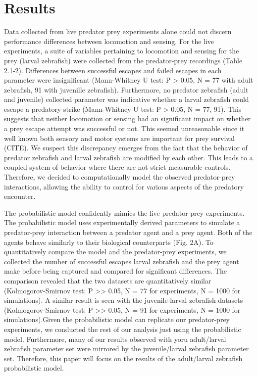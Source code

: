 \documentclass[]{rsos}%
\begin{document}
\section{Results}
Data collected from live predator prey experiments alone could not discern performance differences between locomotion and sensing. For the live experiments, a suite of variables pertaining to locomotion and sensing for the prey (larval zebrafish) were collected from the predator-prey recordings (Table 2.1-2). Differences between successful escapes and failed escapes in each parameter were insignificant (Mann-Whitney U test: P > 0.05, N = 77 with adult zebrafish, 91 with juvenille zebrafish). Furthermore, no predator zebrafish (adult and juvenile) collected parameter was indicative whether a larval zebrafish could escape a predatory strike (Mann-Whitney U test: P > 0.05, N = 77, 91). This suggests that neither locomotion or sensing had an significant impact on whether a prey escape attempt was successful or not. This seemed unreasonable since it well known both sensory and motor systems are important for prey survival (CITE). We suspect this discrepancy emerges from the fact that the behavior of predator zebrafish and larval zebrafish are modified by each other. This leads to a coupled system of behavior where there are not strict measurable controls. Therefore, we decided to computationally model the observed predator-prey interactions, allowing the ability to control for various aspects of the predatory encounter.

The probabilistic model confidently mimics the live predator-prey experiments. The probabilistic model uses experimentally derived parameters to simulate a predator-prey interaction between a predator agent and a prey agent. Both of the agents behave similarly to their biological counterparts (Fig. 2A). To quantitatively compare the model and the predator-prey experiments, we collected the number of successful escapes  larval zebrafish and the prey agent make before being captured and compared for significant differences. The comparison revealed that the two datasets are quantitatively similar (Kolmogorov-Smirnov test: P >> 0.05, N = 77 for experiments,  N = 1000 for simulations). A similar result is seen with the juvenile-larval zebrafish datasets (Kolmogorov-Smirnov test: P >> 0.05, N = 91 for experiments,  N = 1000 for simulations).Given the probabilistic model can replicate our predator-prey experiments, we conducted the rest of our analysis just using the probabilistic model. Furthermore, many of our results observed with yoru adult/larval zebrafish parameter set were mirrored by the juvenile/larval zebrafish parameter set. Therefore, this paper will focus on the results of the adult/larval zebrafish probabilistic model.
\end{document}
